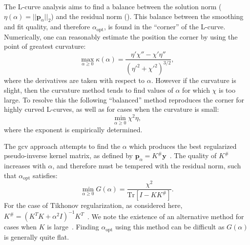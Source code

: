 The L-curve analysis aims to find a balance between the solution norm ($\eta(\alpha) = || \mathbf{p}_\alpha ||_2$) and the residual norm (). This balance between the smoothing and fit quality, and therefore $\alpha_\mathrm{opt}$, is found in the ``corner'' of the L-curve. Numerically, one can reasonably estimate the position the corner by using the point of greatest curvature:
%
\begin{equation}
\max_{\alpha \ge 0}\kappa(\alpha) =  \frac{\eta'\chi'' - \chi'\eta''}{(\eta'^2+\chi'^2)^{3/2}},
\end{equation}
%
where the derivatives are taken with respect to $\alpha$. However if the curvature is slight, then the curvature method tends to find values of $\alpha$ for which $\chi$ is too large. To resolve this the following ``balanced'' method reproduces the corner for highly curved L-curves, as well as for cases when the curvature is small:
%
\begin{equation}
\min_{\alpha \ge 0} \chi^2\eta,
\end{equation}
%
where the exponent is empirically determined. 

The \gls{gcv} approach attempts to find the $\alpha$ which produces the best regularized pseudo-inverse kernel matrix, as defined by $\mathbf{p}_\alpha = K^\#\mathbf{y}$~\cite{1978-Craven-NM-31-377}. The quality of $K^\#$ increases with $\alpha$, and therefore must be tempered with the residual norm, such that $\alpha_\mathrm{opt}$ satisfies: 
%
\begin{equation}
\label{eq:gcv}
   \min_{\alpha \geq 0} G ( \alpha ) = \frac{ \chi^2 }{\mathrm{Tr} \left [ I - K K^\# \right]}.
\end{equation}
%
For the case of Tikhonov regularization, as considered here, $K^\# = \left ( K^T K + \alpha^2 I \right )^{-1} K^{T}$~\cite{Zou2016}. We note the existence of an alternative method for cases when $K$ is large~\cite{1997-Golub-JCGS-6-1}. Finding $\alpha_\mathrm{opt}$ using this method can be difficult as $G ( \alpha )$ is generally quite flat.
